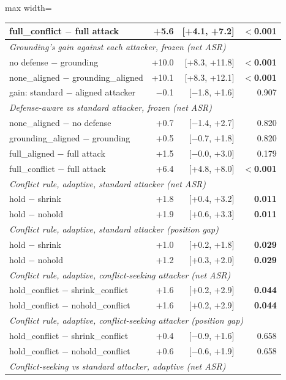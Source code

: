 \begin{table}[t]
\begin{adjustbox}{max width=\linewidth}
\begin{tabular}{lrrr}
full\_conflict $-$ full attack & +5.6 & [+4.1, +7.2] & \textbf{$<$0.001} \\
\midrule
\multicolumn{4}{l}{\textit{Grounding's gain against each attacker, frozen (net ASR)}} \\
no defense $-$ grounding & +10.0 & [+8.3, +11.8] & \textbf{$<$0.001} \\
none\_aligned $-$ grounding\_aligned & +10.1 & [+8.3, +12.1] & \textbf{$<$0.001} \\
gain: standard $-$ aligned attacker & $-$0.1 & [$-$1.8, +1.6] & 0.907 \\
\midrule
\multicolumn{4}{l}{\textit{Defense-aware vs standard attacker, frozen (net ASR)}} \\
none\_aligned $-$ no defense & +0.7 & [$-$1.4, +2.7] & 0.820 \\
grounding\_aligned $-$ grounding & +0.5 & [$-$0.7, +1.8] & 0.820 \\
full\_aligned $-$ full attack & +1.5 & [$-$0.0, +3.0] & 0.179 \\
full\_conflict $-$ full attack & +6.4 & [+4.8, +8.0] & \textbf{$<$0.001} \\
\midrule
\multicolumn{4}{l}{\textit{Conflict rule, adaptive, standard attacker (net ASR)}} \\
hold $-$ shrink & +1.8 & [+0.4, +3.2] & \textbf{0.011} \\
hold $-$ nohold & +1.9 & [+0.6, +3.3] & \textbf{0.011} \\
\midrule
\multicolumn{4}{l}{\textit{Conflict rule, adaptive, standard attacker (position gap)}} \\
hold $-$ shrink & +1.0 & [+0.2, +1.8] & \textbf{0.029} \\
hold $-$ nohold & +1.2 & [+0.3, +2.0] & \textbf{0.029} \\
\midrule
\multicolumn{4}{l}{\textit{Conflict rule, adaptive, conflict-seeking attacker (net ASR)}} \\
hold\_conflict $-$ shrink\_conflict & +1.6 & [+0.2, +2.9] & \textbf{0.044} \\
hold\_conflict $-$ nohold\_conflict & +1.6 & [+0.2, +2.9] & \textbf{0.044} \\
\midrule
\multicolumn{4}{l}{\textit{Conflict rule, adaptive, conflict-seeking attacker (position gap)}} \\
hold\_conflict $-$ shrink\_conflict & +0.4 & [$-$0.9, +1.6] & 0.658 \\
hold\_conflict $-$ nohold\_conflict & +0.6 & [$-$0.6, +1.9] & 0.658 \\
\midrule
\multicolumn{4}{l}{\textit{Conflict-seeking vs standard attacker, adaptive (net ASR)}} \\

\end{tabular}
\end{adjustbox}
\end{table}
